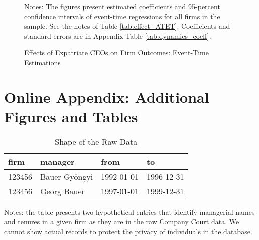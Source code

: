 \documentclass[12pt,a4paper]{article}
\begin{document}
\begin{singlespace}
\clearpage

\begin{figure}[h]
    \centering
    \vspace*{.2cm}
    \vspace*{.2cm}
\begin{minipage}{14 cm}
    \caption{Effects of Expatriate CEOs on Firm Outcomes: Event-Time Estimations}
    \label{fig:dynamics}
{Notes: The figures present estimated coefficients and 95-percent confidence intervals of event-time regressions for all firms in the sample. See the notes of Table \ref{tab:effect_ATET}. Coefficients and standard errors are in Appendix Table \ref{tab:dynamics_coeff}.} 
    \end{minipage}    
\end{figure}

\clearpage


\section*{Online Appendix: Additional Figures and Tables}
\vspace*{3 cm}

\setcounter{table}{0}
\renewcommand{\thetable}{A\arabic{table}}
\setcounter{figure}{0}
\renewcommand{\thefigure}{A\arabic{figure}}

    \begin{table}[h!]
    \caption{Shape of the Raw Data}
    \label{table:rawdata}
    \centering
    \begin{tabular}{|l|l|l|l|}
    \hline
    firm & manager & from & to \\
    \hline
    123456 & Bauer Gyöngyi & 1992-01-01 & 1996-12-31 \\
    123456 & Georg Bauer & 1997-01-01 & 1999-12-31 \\
    \hline
    \end{tabular}
     \begin{minipage}{9.5cm}
    \vspace{.2cm}
          \footnotesize {Notes: the table presents two hypothetical entries that identify managerial names and tenures in a given firm as they are in the raw Company Court data. We cannot show actual records to protect the privacy of individuals in the database.}
    \end{minipage}
    \end{table}


\end{singlespace}
\end{document}
